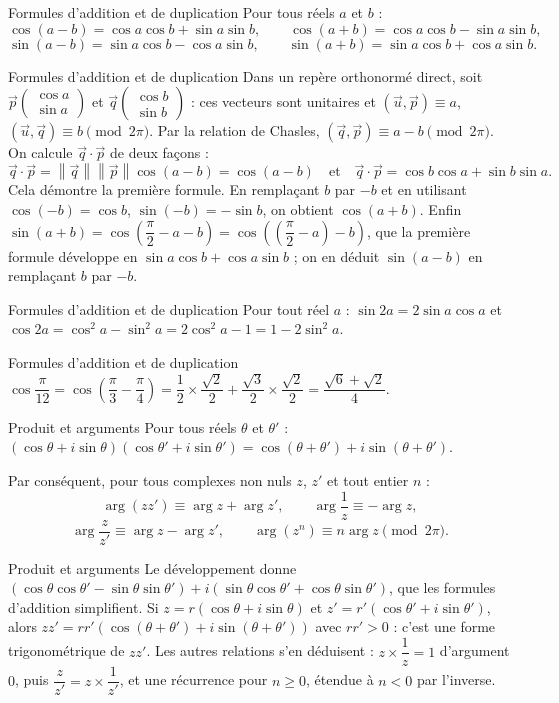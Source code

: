 \documentclass[aspectratio=169,10pt]{beamer}
\providecommand{\vect}[1]{\overrightarrow{#1}}
\providecommand{\norm}[1]{\left\lVert #1\right\rVert}
\providecommand{\vc}[2]{\begin{pmatrix}#1\\#2\end{pmatrix}}
\begin{document}
\begin{frame}{Formules d'addition et de duplication}
Pour tous réels \(a\) et \(b\) :
\[\cos(a-b)=\cos a\cos b+\sin a\sin b,\qquad\cos(a+b)=\cos a\cos b-\sin a\sin b,\]
\[\sin(a-b)=\sin a\cos b-\cos a\sin b,\qquad\sin(a+b)=\sin a\cos b+\cos a\sin b.\]
\end{frame}
\begin{frame}{Formules d'addition et de duplication}
Dans un repère orthonormé direct, soit \(\vect p\vc{\cos a}{\sin a}\) et \(\vect q\vc{\cos b}{\sin b}\) : ces vecteurs sont unitaires et \(\left(\vect u,\vect p\right)\equiv a\), \(\left(\vect u,\vect q\right)\equiv b\pmod{2\pi}\). Par la relation de Chasles, \(\left(\vect q,\vect p\right)\equiv a-b\pmod{2\pi}\). On calcule \(\vect q\cdot\vect p\) de deux façons :
\[\vect q\cdot\vect p=\norm{\vect q}\norm{\vect p}\cos(a-b)=\cos(a-b)\quad\text{et}\quad\vect q\cdot\vect p=\cos b\cos a+\sin b\sin a.\]
Cela démontre la première formule. En remplaçant \(b\) par \(-b\) et en utilisant \(\cos(-b)=\cos b\), \(\sin(-b)=-\sin b\), on obtient \(\cos(a+b)\). Enfin \(\sin(a+b)=\cos\left(\dfrac\pi2-a-b\right)=\cos\left(\left(\dfrac\pi2-a\right)-b\right)\), que la première formule développe en \(\sin a\cos b+\cos a\sin b\) ; on en déduit \(\sin(a-b)\) en remplaçant \(b\) par \(-b\).
\end{frame}
\begin{frame}{Formules d'addition et de duplication}
Pour tout réel \(a\) : \(\sin2a=2\sin a\cos a\) et \(\cos2a=\cos^2a-\sin^2a=2\cos^2a-1=1-2\sin^2a\).
\end{frame}
\begin{frame}{Formules d'addition et de duplication}
\(\cos\dfrac{\pi}{12}=\cos\left(\dfrac\pi3-\dfrac\pi4\right)=\dfrac12\times\dfrac{\sqrt2}2+\dfrac{\sqrt3}2\times\dfrac{\sqrt2}2=\dfrac{\sqrt6+\sqrt2}4\).
\end{frame}
\begin{frame}{Produit et arguments}
Pour tous réels \(\theta\) et \(\theta'\) : \((\cos\theta+i\sin\theta)(\cos\theta'+i\sin\theta')=\cos(\theta+\theta')+i\sin(\theta+\theta')\).

Par conséquent, pour tous complexes non nuls \(z\), \(z'\) et tout entier \(n\) :
\[\arg(zz')\equiv\arg z+\arg z',\qquad\arg\dfrac1z\equiv-\arg z,\]
\[\arg\dfrac z{z'}\equiv\arg z-\arg z',\qquad\arg\left(z^n\right)\equiv n\arg z\pmod{2\pi}.\]
\end{frame}
\begin{frame}{Produit et arguments}
Le développement donne \((\cos\theta\cos\theta'-\sin\theta\sin\theta')+i(\sin\theta\cos\theta'+\cos\theta\sin\theta')\), que les formules d'addition simplifient. Si \(z=r(\cos\theta+i\sin\theta)\) et \(z'=r'(\cos\theta'+i\sin\theta')\), alors \(zz'=rr'(\cos(\theta+\theta')+i\sin(\theta+\theta'))\) avec \(rr'>0\) : c'est une forme trigonométrique de \(zz'\). Les autres relations s'en déduisent : \(z\times\dfrac1z=1\) d'argument \(0\), puis \(\dfrac z{z'}=z\times\dfrac1{z'}\), et une récurrence pour \(n\ge0\), étendue à \(n<0\) par l'inverse.
\end{frame}
\end{document}

